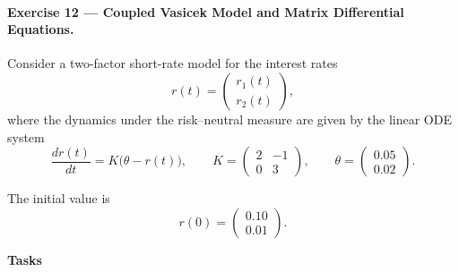 \documentclass[11pt]{article}
\begin{document}
\paragraph{Exercise 12 — Coupled Vasicek Model and Matrix Differential Equations.}

Consider a two-factor short-rate model for the interest rates
\[
r(t)=
\begin{pmatrix}
r_1(t)\\
r_2(t)
\end{pmatrix},
\]
where the dynamics under the risk–neutral measure are given by the linear ODE system
\[
\frac{d r(t)}{dt}
= 
K\bigl(\theta - r(t)\bigr),
\qquad
K =
\begin{pmatrix}
2 & -1 \\
0 & 3
\end{pmatrix},
\qquad
\theta =
\begin{pmatrix}
0.05\\
0.02
\end{pmatrix}.
\]

The initial value is
\[
r(0)=
\begin{pmatrix}
0.10\\
0.01
\end{pmatrix}.
\]

\bigskip

\textbf{Tasks}
\end{document}
